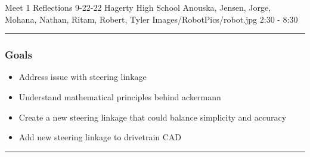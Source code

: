 \insertmeeting 
	{Meet 1 Reflections} 
	{9-22-22} 
	{Hagerty High School}
	{Anouska, Jensen, Jorge, Mohana, Nathan, Ritam, Robert, Tyler}
	{Images/RobotPics/robot.jpg}
	{2:30 - 8:30}
	
\noindent\hfil\rule{\textwidth}{.4pt}\hfil
\subsubsection*{Goals}
\begin{itemize}
    \item Address issue with steering linkage
    \item Understand mathematical principles behind ackermann
    \item Create a new steering linkage that could balance simplicity and accuracy
    \item Add new steering linkage to drivetrain CAD




\end{itemize} 

\noindent\hfil\rule{\textwidth}{.4pt}\hfil

